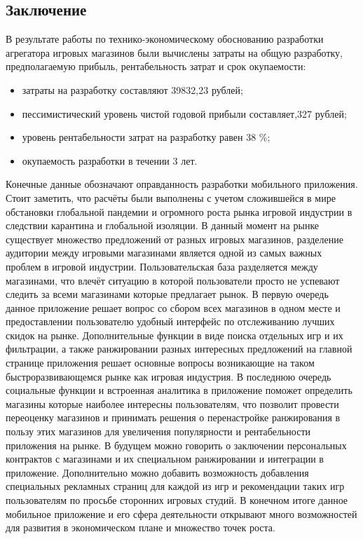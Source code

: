 \subsection{Заключение}
В результате работы по технико-экономическому обоснованию разработки агрегатора игровых магазинов были вычислены затраты на общую разработку, предполагаемую прибыль, рентабельность затрат и срок окупаемости:
\begin{itemize}
 \item затраты на разработку составляют 39832,23 рублей;
 \item пессимистический уровень чистой годовой прибыли составляет,327 рублей;
 \item уровень рентабельности затрат на разработку равен 38 \%;
 \item окупаемость разработки в течении 3 лет.
\end{itemize}
 Конечные данные обозначают оправданность разработки мобильного приложения. Стоит заметить, что расчёты были выполнены с учетом сложившейся в мире обстановки глобальной пандемии и огромного роста рынка игровой индустрии в следствии карантина и глобальной изоляции. В данный момент на рынке существует множество предложений от разных игровых магазинов, разделение аудитории между игровыми магазинами является одной из самых важных проблем в игровой индустрии. Пользовательская база разделяется между магазинами, что влечёт ситуацию в которой пользователи просто не успевают следить за всеми магазинами которые предлагает рынок. В первую очередь данное приложение решает вопрос со сбором всех магазинов в одном месте и предоставлении пользователю удобный интерфейс по отслеживанию лучших скидок на рынке. Дополнительные функции в виде поиска отдельных игр и их фильтрации, а также ранжировании разных интересных предложений на главной странице приложения решает основные вопросы возникающие на таком быстроразвивающемся рынке как игровая индустрия. В последнюю очередь социальные функции и встроенная аналитика в приложение поможет определить магазины которые наиболее интересны пользователям, что позволит провести переоценку магазинов и принимать решения о перенастройке ранжирования в пользу этих магазинов для увеличения популярности и рентабельности приложения на рынке. В будущем можно говорить о заключении персональных контрактов с магазинами и их специальном ранжировании и интеграции в приложение. Дополнительно можно добавить возможность добавления специальных рекламных страниц для каждой из игр и рекомендации таких игр пользователям по просьбе сторонних игровых студий. В конечном итоге данное мобильное приложение и его сфера деятельности открывают много возможностей для развития в экономическом плане и множество точек роста.
 

